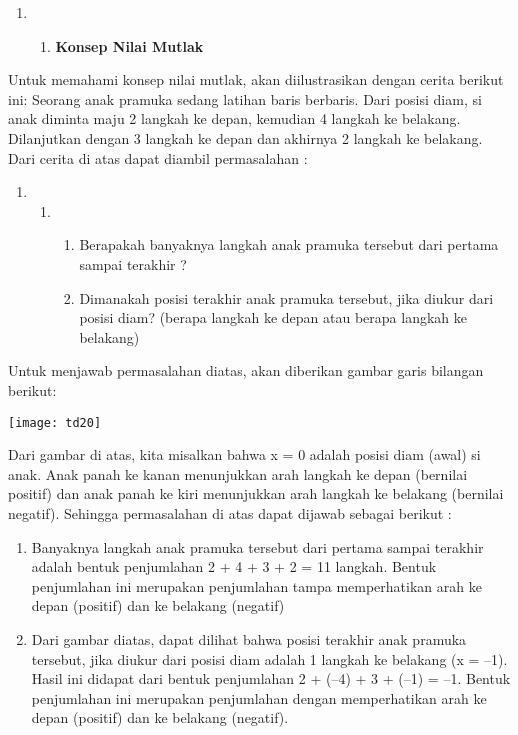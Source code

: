 \documentclass[11pt,fleqn]{book} %
\begin{document}
\begin{enumerate}
\item \begin{enumerate}
\item \textbf{ Konsep Nilai Mutlak}
\end{enumerate}
\end{enumerate}

\noindent Untuk memahami konsep nilai mutlak, akan diilustrasikan dengan cerita berikut ini: Seorang anak pramuka sedang latihan baris berbaris. Dari posisi diam, si anak diminta maju 2 langkah ke depan, kemudian 4 langkah ke belakang. Dilanjutkan dengan 3 langkah ke depan dan akhirnya 2 langkah ke belakang. Dari cerita di atas dapat diambil permasalahan :

\begin{enumerate}
\item \begin{enumerate}
\item \begin{enumerate}
\item  Berapakah banyaknya langkah anak pramuka tersebut dari pertama sampai terakhir ?

\item  Dimanakah posisi terakhir anak pramuka tersebut, jika diukur dari posisi diam? (berapa langkah ke depan atau berapa langkah ke belakang) 
\end{enumerate}
\end{enumerate}
\end{enumerate}

\noindent  

\noindent Untuk menjawab permasalahan diatas, akan diberikan gambar garis bilangan berikut:

\noindent \texttt{[image: td20]}

\noindent Dari gambar di atas, kita misalkan bahwa x = 0 adalah posisi diam (awal) si anak. Anak panah ke kanan menunjukkan arah langkah ke depan (bernilai positif) dan anak panah ke kiri menunjukkan arah langkah ke belakang (bernilai negatif). Sehingga permasalahan di atas dapat dijawab sebagai berikut : 

\begin{enumerate}
\item  Banyaknya langkah anak pramuka  tersebut dari pertama sampai terakhir  adalah bentuk penjumlahan  2 + 4 + 3 + 2 = 11 langkah. Bentuk penjumlahan ini merupakan penjumlahan tampa memperhatikan arah ke depan (positif) dan ke belakang (negatif) 

\item  Dari gambar diatas, dapat dilihat bahwa posisi terakhir anak pramuka tersebut, jika diukur dari posisi diam adalah 1 langkah ke belakang (x = --1). Hasil ini didapat dari bentuk penjumlahan  2 + (--4) + 3 + (--1)  =  --1. Bentuk penjumlahan ini merupakan penjumlahan dengan memperhatikan arah ke depan (positif) dan ke belakang (negatif).  
\end{enumerate}
\end{document}
